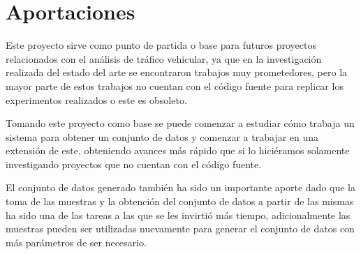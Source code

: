 \section{Aportaciones}

Este proyecto sirve como punto de partida o base para futuros proyectos relacionados con el análisis de tráfico vehicular, ya que en la investigación realizada del estado del arte se encontraron trabajos muy prometedores, pero la mayor parte de estos trabajos no cuentan con el código fuente para replicar los experimentos realizados o este es obsoleto.

Tomando este proyecto como base se puede comenzar a estudiar cómo trabaja un sistema para obtener un conjunto de datos y comenzar a trabajar en una extensión de este, obteniendo avances más rápido que si lo hiciéramos solamente investigando proyectos que no cuentan con el código fuente.

El conjunto de datos generado también ha sido un importante aporte dado que la toma de las muestras y la obtención del conjunto de datos a partir de las mismas ha sido una de las tareas a las que se les invirtió más tiempo, adicionalmente las muestras pueden ser utilizadas nuevamente para generar el conjunto de datos con más parámetros de ser necesario.
